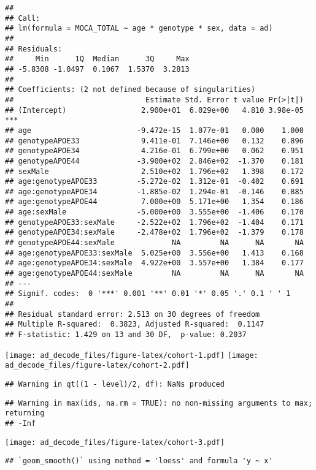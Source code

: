 \documentclass[
]{article}
\begin{document}
\begin{verbatim}
## 
## Call:
## lm(formula = MOCA_TOTAL ~ age * genotype * sex, data = ad)
## 
## Residuals:
##     Min      1Q  Median      3Q     Max 
## -5.8308 -1.0497  0.1067  1.5370  3.2813 
## 
## Coefficients: (2 not defined because of singularities)
##                              Estimate Std. Error t value Pr(>|t|)    
## (Intercept)                 2.900e+01  6.029e+00   4.810 3.98e-05 ***
## age                        -9.472e-15  1.077e-01   0.000    1.000    
## genotypeAPOE33              9.411e-01  7.146e+00   0.132    0.896    
## genotypeAPOE34              4.216e-01  6.799e+00   0.062    0.951    
## genotypeAPOE44             -3.900e+02  2.846e+02  -1.370    0.181    
## sexMale                     2.510e+02  1.796e+02   1.398    0.172    
## age:genotypeAPOE33         -5.272e-02  1.312e-01  -0.402    0.691    
## age:genotypeAPOE34         -1.885e-02  1.294e-01  -0.146    0.885    
## age:genotypeAPOE44          7.000e+00  5.171e+00   1.354    0.186    
## age:sexMale                -5.000e+00  3.555e+00  -1.406    0.170    
## genotypeAPOE33:sexMale     -2.522e+02  1.796e+02  -1.404    0.171    
## genotypeAPOE34:sexMale     -2.478e+02  1.796e+02  -1.379    0.178    
## genotypeAPOE44:sexMale             NA         NA      NA       NA    
## age:genotypeAPOE33:sexMale  5.025e+00  3.556e+00   1.413    0.168    
## age:genotypeAPOE34:sexMale  4.922e+00  3.557e+00   1.384    0.177    
## age:genotypeAPOE44:sexMale         NA         NA      NA       NA    
## ---
## Signif. codes:  0 '***' 0.001 '**' 0.01 '*' 0.05 '.' 0.1 ' ' 1
## 
## Residual standard error: 2.513 on 30 degrees of freedom
## Multiple R-squared:  0.3823, Adjusted R-squared:  0.1147 
## F-statistic: 1.429 on 13 and 30 DF,  p-value: 0.2037
\end{verbatim}

\texttt{[image: ad\_decode\_files/figure-latex/cohort-1.pdf]}
\texttt{[image: ad\_decode\_files/figure-latex/cohort-2.pdf]}

\begin{verbatim}
## Warning in qt((1 - level)/2, df): NaNs produced
\end{verbatim}

\begin{verbatim}
## Warning in max(ids, na.rm = TRUE): no non-missing arguments to max; returning
## -Inf
\end{verbatim}

\texttt{[image: ad\_decode\_files/figure-latex/cohort-3.pdf]}

\begin{verbatim}
## `geom_smooth()` using method = 'loess' and formula 'y ~ x'
\end{verbatim}
\end{document}
